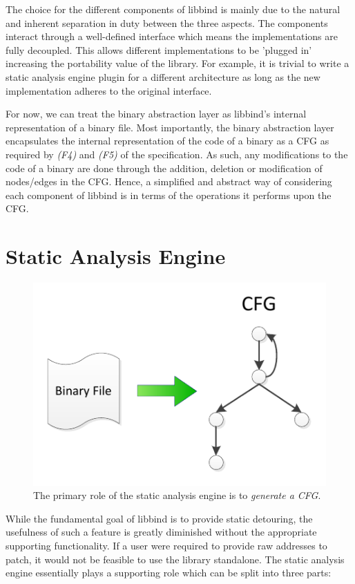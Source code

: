 The choice for the different components of libbind is mainly due to the natural and inherent separation in duty between the three aspects. The components interact through a well-defined interface which means the implementations are fully decoupled. This allows different implementations to be 'plugged in' increasing the portability value of the library. For example, it is trivial to write a static analysis engine plugin for a different architecture as long as the new implementation adheres to the original interface.

For now, we can treat the binary abstraction layer as libbind's internal representation of a binary file. Most importantly, the binary abstraction layer encapsulates the internal representation of the code of a binary as a CFG as required by \emph{(F4)} and \emph{(F5)} of the specification. As such, any modifications to the code of a binary are done through the addition, deletion or modification of nodes/edges in the CFG. Hence, a simplified and abstract way of considering each component of libbind is in terms of the operations it performs upon the CFG.

\section{Static Analysis Engine}

\begin{figure}[H]
 \centering
 \includegraphics{Static_Analysis_Engine.pdf}
 \caption[Static Analysis Engine]{The primary role of the static analysis engine is to \emph{generate a CFG}.}
\end{figure}

While the fundamental goal of libbind is to provide static detouring, the usefulness of such a feature is greatly diminished without the appropriate supporting functionality. If a user were required to provide raw addresses to patch, it would not be feasible to use the library standalone. The static analysis engine essentially plays a supporting role which can be split into three parts:

